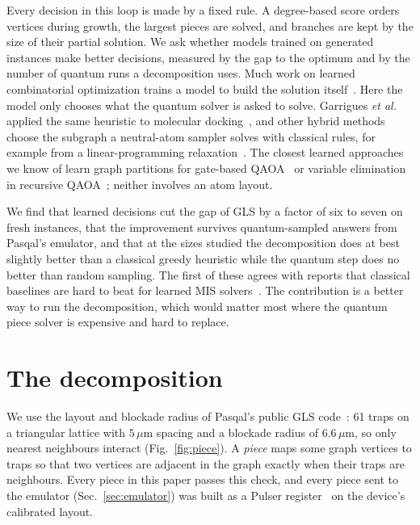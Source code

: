 \documentclass[10pt,pra,aps,twocolumn,superscriptaddress,floatfix,nofootinbib]{revtex4-2}
\newcommand{\GLS}{GLS}
\begin{document}
Every decision in this loop is made by a fixed rule. A degree-based score orders vertices during growth, the largest pieces are solved, and branches are kept by the size of their partial solution. We ask whether models trained on generated instances make better decisions, measured by the gap to the optimum and by the number of quantum runs a decomposition uses. Much work on learned combinatorial optimization trains a model to build the solution itself~\cite{khalil2017learning,li2018combinatorial,ahn2020defer}. Here the model only chooses what the quantum solver is asked to solve. Garrigues \textit{et al.} applied the same heuristic to molecular docking~\cite{garrigues2025docking}, and other hybrid methods choose the subgraph a neutral-atom sampler solves with classical rules, for example from a linear-programming relaxation~\cite{perron2026lpquts}. The closest learned approaches we know of learn graph partitions for gate-based QAOA~\cite{zheng2026neuralqaoa} or variable elimination in recursive QAOA~\cite{patel2022rlrqaoa}; neither involves an atom layout.

We find that learned decisions cut the gap of \GLS{} by a factor of six to seven on fresh instances, that the improvement survives quantum-sampled answers from Pasqal's emulator, and that at the sizes studied the decomposition does at best slightly better than a classical greedy heuristic while the quantum step does no better than random sampling. The first of these agrees with reports that classical baselines are hard to beat for learned MIS solvers~\cite{bother2022wrong}. The contribution is a better way to run the decomposition, which would matter most where the quantum piece solver is expensive and hard to replace.

\section{The decomposition}
\label{sec:decomposition}

We use the layout and blockade radius of Pasqal's public \GLS{} code~\cite{garrigues2025docking}: 61 traps on a triangular lattice with $5\,\mu$m spacing and a blockade radius of $6.6\,\mu$m, so only nearest neighbours interact (Fig.~\ref{fig:piece}). A \emph{piece} maps some graph vertices to traps so that two vertices are adjacent in the graph exactly when their traps are neighbours. Every piece in this paper passes this check, and every piece sent to the emulator (Sec.~\ref{sec:emulator}) was built as a Pulser register~\cite{silverio2022pulser} on the device's calibrated layout.
\end{document}
